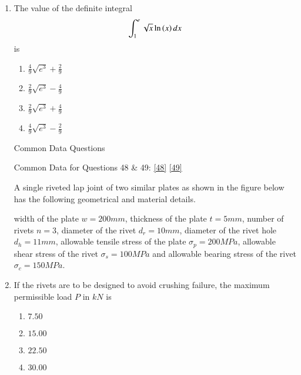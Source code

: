 \documentclass[journal]{IEEEtran}
\numberwithin{equation}{enumi}
\numberwithin{figure}{enumi}
\begin{document}
\begin{enumerate}
    \item 
    The value of the definite integral
    \begin{align*}
        \int_1^e \sqrt{x}\ln{\ensuremath{\left(x\right)}}\, dx
    \end{align*}
    is
    \hfill{}

    \begin{multicols}{4}
        \begin{enumerate}
            \item $\frac{4}{9}\sqrt{e^3} + \frac{2}{9}$
            \item $\frac{2}{9}\sqrt{e^3} - \frac{4}{9}$
            \item $\frac{2}{9}\sqrt{e^3} + \frac{4}{9}$
            \item $\frac{4}{9}\sqrt{e^3} - \frac{2}{9}$
        \end{enumerate}
    \end{multicols}

    \begin{center}
        Common Data Questions
    \end{center}
    \begin{center}
        Common Data for Questions 48 \& 49: \ref{48} \ref{49}
    \end{center}
    A single riveted lap joint of two similar plates as shown in the figure below has the following geometrical
    and material details.
    
    \begin{figure}[H]
    \centering
    \resizebox{0.8\textwidth}{!}{}
    \end{figure}

    width of the plate $w = 200 mm$, thickness of the plate $t = 5 mm$, number of rivets $n = 3$, diameter of the rivet $d_r = 10 mm$, diameter of the rivet hole $d_h = 11 mm$, allowable tensile stress of the plate $\sigma_p = 200 MPa$, allowable shear stress of the rivet $\sigma_s = 100 MPa$ and allowable bearing stress of the rivet $\sigma_c = 150 MPa$.\\

    \item 
    If the rivets are to be designed to avoid crushing failure, the maximum permissible load $P$ in $kN$ is \label{48}
    \hfill{}

    \begin{multicols}{4}
        \begin{enumerate}
            \item $7.50$
            \item $15.00$
            \item $22.50$
            \item $30.00$
        \end{enumerate}
    \end{multicols}


\end{enumerate}
\end{document}
